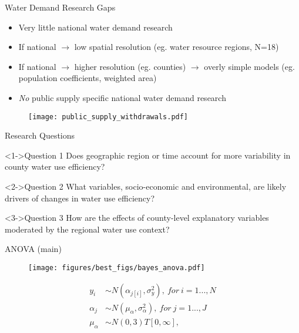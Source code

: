 \documentclass[pdf]{beamer}
\begin{document}

\begin{frame}{Water Demand Research Gaps}
\begin{itemize} 
\item Very little national water demand research
\item If national $\longrightarrow$ low spatial resolution (eg. water resource regions, N=18) 
\item If national $\longrightarrow$ higher resolution (eg. counties) $\longrightarrow$ overly simple models (eg. population coefficients, weighted area)
\item \textit{No} public supply specific national water demand research
\end{itemize}
\vspace{-1cm}
\begin{figure}[ht]
\begin{center}
\texttt{[image: public\_supply\_withdrawals.pdf]}
\end{center}
\end{figure}

\end{frame}


\begin{frame}{Research Questions}
\begin{block}<1->{Question 1}
Does geographic region or time account for more variability in county water use efficiency? 
\end{block}
\vspace{0.5 cm}
\begin{block}<2->{Question 2}
What variables, socio-economic and environmental, are likely drivers of changes in water use efficiency?
\end{block}
\vspace{0.5 cm}
\begin{block}<3->{Question 3}
How are the effects of county-level explanatory variables moderated by the regional water use context?
\end{block}
\end{frame}


\begin{frame}{ANOVA (main)}
\begin{figure}[ht]
\begin{center}
\texttt{[image: figures/best\_figs/bayes\_anova.pdf]}
\end{center}
\end{figure}
\vspace{-0.5 cm}
\footnotesize
\begin{align*} 
y_i &\sim  N(\alpha_{j[i]},\sigma^2_y), ~ for ~ i=1...,N \\
\alpha_j &\sim  N(\mu_\alpha,\sigma^2_\alpha), ~ for ~ j=1...,J \\
\mu_\alpha &\sim N(0,3)T[0,\infty],
\end{align*}
\normalsize
\end{frame}
\end{document}
